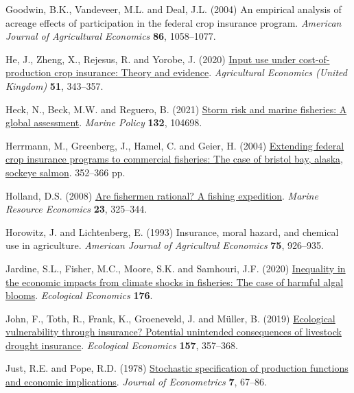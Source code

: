 \documentclass[
  letterpaper,
  DIV=11,
  numbers=noendperiod]{scrartcl}
\newlength{\cslhangindent}
\newenvironment{CSLReferences}[2] %
 {\begin{list}{}{%
  \setlength{\itemindent}{0pt}
  \setlength{\leftmargin}{0pt}
  \setlength{\parsep}{0pt}
  \ifodd #1
   \setlength{\leftmargin}{\cslhangindent}
   \setlength{\itemindent}{-1\cslhangindent}
  \fi
  \setlength{\itemsep}{#2\baselineskip}}}
 {\end{list}}
\theoremstyle{plain}
\theoremstyle{plain}
\theoremstyle{remark}
\begin{document}
\begin{CSLReferences}{1}{0}
Goodwin, B.K., Vandeveer, M.L. and Deal, J.L. (2004) An empirical
analysis of acreage effects of participation in the federal crop
insurance program. \emph{American Journal of Agricultural Economics}
\textbf{86}, 1058--1077.

He, J., Zheng, X., Rejesus, R. and Yorobe, J. (2020)
\href{https://doi.org/10.1111/AGEC.12558}{Input use under
cost-of-production crop insurance: Theory and evidence}.
\emph{Agricultural Economics (United Kingdom)} \textbf{51}, 343--357.

Heck, N., Beck, M.W. and Reguero, B. (2021)
\href{https://doi.org/10.1016/j.marpol.2021.104698}{Storm risk and
marine fisheries: A global assessment}. \emph{Marine Policy}
\textbf{132}, 104698.

Herrmann, M., Greenberg, J., Hamel, C. and Geier, H. (2004)
\href{https://doi.org/10.1577/M02-086.1}{Extending federal crop
insurance programs to commercial fisheries: The case of bristol bay,
alaska, sockeye salmon}. 352--366 pp.

Holland, D.S. (2008)
\href{https://doi.org/10.1086/mre.23.3.42629621}{Are fishermen rational?
A fishing expedition}. \emph{Marine Resource Economics} \textbf{23},
325--344.

Horowitz, J. and Lichtenberg, E. (1993) Insurance, moral hazard, and
chemical use in agriculture. \emph{American Journal of Agricultral
Economics} \textbf{75}, 926--935.

Jardine, S.L., Fisher, M.C., Moore, S.K. and Samhouri, J.F. (2020)
\href{https://doi.org/10.1016/j.ecolecon.2020.106691}{Inequality in the
economic impacts from climate shocks in fisheries: The case of harmful
algal blooms}. \emph{Ecological Economics} \textbf{176}.

John, F., Toth, R., Frank, K., Groeneveld, J. and Müller, B. (2019)
\href{https://doi.org/10.1016/J.ECOLECON.2018.11.021}{Ecological
vulnerability through insurance? Potential unintended consequences of
livestock drought insurance}. \emph{Ecological Economics} \textbf{157},
357--368.

Just, R.E. and Pope, R.D. (1978)
\href{https://doi.org/10.1016/0304-4076(78)90006-4}{Stochastic
specification of production functions and economic implications}.
\emph{Journal of Econometrics} \textbf{7}, 67--86.


\end{CSLReferences}
\end{document}
